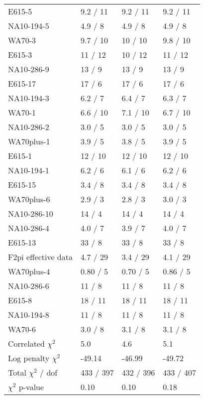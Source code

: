 \documentclass[12pt]{report}
\begin{document}
\begin{table}
\begin{center}
{\begin{tabular}{lp{2.20cm}p{2.20cm}p{2.20cm}}
  E615-5 & 9.2 / 11& 9.2 / 11& 9.2 / 11  \\ 
  NA10-194-5 & 4.9 / 8& 4.9 / 8& 4.9 / 8  \\ 
  WA70-3 & 9.7 / 10& 10 / 10& 9.8 / 10  \\ 
  E615-3 & 11 / 12& 10 / 12& 11 / 12  \\ 
  NA10-286-9 & 13 / 9& 13 / 9& 13 / 9  \\ 
  E615-17 & 17 / 6& 17 / 6& 17 / 6  \\ 
  NA10-194-3 & 6.2 / 7& 6.4 / 7& 6.3 / 7  \\ 
  WA70-1 & 6.6 / 10& 7.1 / 10& 6.7 / 10  \\ 
  NA10-286-2 & 3.0 / 5& 3.0 / 5& 3.0 / 5  \\ 
  WA70plus-1 & 3.9 / 5& 3.8 / 5& 3.9 / 5  \\ 
  E615-1 & 12 / 10& 12 / 10& 12 / 10  \\ 
  NA10-194-1 & 6.2 / 6& 6.1 / 6& 6.2 / 6  \\ 
  E615-15 & 3.4 / 8& 3.4 / 8& 3.4 / 8  \\ 
  WA70plus-6 & 2.9 / 3& 2.8 / 3& 3.0 / 3  \\ 
  NA10-286-10 & 14 / 4& 14 / 4& 14 / 4  \\ 
  NA10-286-4 & 4.0 / 7& 3.9 / 7& 4.0 / 7  \\ 
  E615-13 & 33 / 8& 33 / 8& 33 / 8  \\ 
  F2pi effective data & 4.7 / 29& 3.4 / 29& 4.1 / 29  \\ 
  WA70plus-4 & 0.80 / 5& 0.70 / 5& 0.86 / 5  \\ 
  NA10-286-6 & 11 / 8& 11 / 8& 11 / 8  \\ 
  E615-8 & 18 / 11& 18 / 11& 18 / 11  \\ 
  NA10-194-8 & 11 / 8& 11 / 8& 11 / 8  \\ 
  WA70-6 & 3.0 / 8& 3.1 / 8& 3.1 / 8  \\ 
  Correlated $\chi^2$  & 5.0& 4.6& 5.1  \\ 
  Log penalty $\chi^2$  & -49.14& -46.99& -49.72  \\ 
  \rowcolor{white}
      \midrule
  Total $\chi^2$ / dof  & 433 / 397& 432 / 396& 433 / 407  \\ 
  \rowcolor{white}
      \midrule
  $\chi^2$ p-value  & 0.10 & 0.10 & 0.18   \\ 
      \bottomrule
    \end{tabular}
  }
  \end{center}
\end{table}
\end{document}
